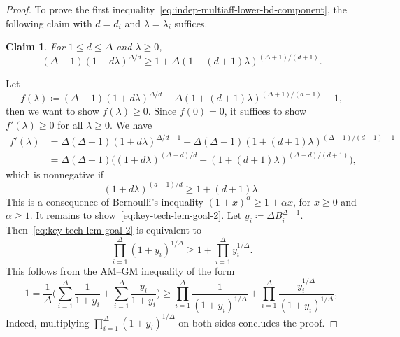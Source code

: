\documentclass{article}
\makeatletter
\numberwithin{equation}{section}
\theoremstyle{plain}
\newtheorem{claim}[theorem]{Claim}
\theoremstyle{definition}
\theoremstyle{remark} %
\newenvironment{claimproof}[1][Proof]{\par
    \pushQED{\qed}%
    \renewcommand{\qedsymbol}{$\blacksquare$}
    \normalfont \topsep6\p@\@plus6\p@\relax
    \trivlist
    \item[\hskip\labelsep
    \textit{#1}\@addpunct{.}~]\ignorespaces
}{%
    \popQED\endtrivlist\@endpefalse
}
\newcommand{\defeq}{\coloneqq}
\makeatother
\begin{document}
\begin{proof}
    To prove the first inequality~\eqref{eq:indep-multiaff-lower-bd-component}, the following claim with \(d=d_i\) and \(\lambda=\lambda_i\) suffices.
    \begin{claim}\label{clm:key-tech-lem-sub-1}
        For \(1\le d\le \Delta\) and \(\lambda\ge0\),
        \[
            (\Delta+1) (1+d\lambda)^{\Delta/d} \ge 1 + \Delta (1+(d+1)\lambda)^{(\Delta+1)/(d+1)}.
        \]
    \end{claim}
    \begin{claimproof}
        Let
        \[
            f(\lambda) \defeq (\Delta+1) (1+d\lambda)^{\Delta/d} - \Delta (1+(d+1)\lambda)^{(\Delta+1)/(d+1)} - 1,
        \]
        then we want to show \(f(\lambda)\ge0\).
        Since \(f(0)=0\), it suffices to show \(f'(\lambda)\ge0\) for all \(\lambda\ge0\). We have
        \begin{align*}
            f'(\lambda)
            &= \Delta(\Delta+1) (1+d\lambda)^{\Delta/d-1} - \Delta(\Delta+1)(1+(d+1)\lambda)^{(\Delta+1)/(d+1)-1}
            \\&= \Delta(\Delta+1) \bigl( (1+d\lambda)^{(\Delta-d)/d} - (1+(d+1)\lambda)^{(\Delta-d)/(d+1)} \bigr),
        \end{align*}
        which is nonnegative if
        \[
            (1+d\lambda)^{(d+1)/d} \ge 1+(d+1)\lambda.
        \]
        This is a consequence of Bernoulli's inequality \((1+x)^\alpha\ge 1+\alpha x\), for \(x\ge0\) and \(\alpha\ge1\).
    \end{claimproof}
    It remains to show~\eqref{eq:key-tech-lem-goal-2}. Let $y_i\defeq\Delta B_i^{\Delta+1}$. Then~\eqref{eq:key-tech-lem-goal-2} is equivalent to 
    \[
        \prod_{i=1}^\Delta (1+y_i)^{1/\Delta} \ge 1+\prod_{i=1}^\Delta y_i^{1/\Delta}.
    \]
    This follows from the AM--GM inequality of the form
    \[
        1
        = \frac{1}{\Delta} \biggl( \sum_{i=1}^\Delta \frac{1}{1+y_i} + \sum_{i=1}^\Delta \frac{y_i}{1+y_i} \biggr)
        \ge \prod_{i=1}^\Delta \frac{1}{(1+y_i)^{1/\Delta}} + \prod_{i=1}^\Delta \frac{y_i^{1/\Delta}}{(1+y_i)^{1/\Delta}},
    \]
     Indeed, multiplying $\prod_{i=1}^\Delta (1+y_i)^{1/\Delta}$ on both sides concludes the proof.
\end{proof}
\end{document}
